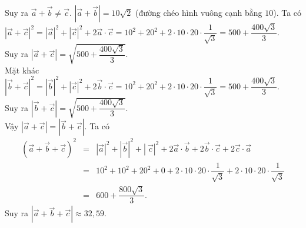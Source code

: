 \begin{ex}
{\begin{itemchoice}
			Suy ra $\overrightarrow{a}+\overrightarrow{b} \ne  \overrightarrow{c}$.
			\itemch $|\overrightarrow{a}+\overrightarrow{b}|=10\sqrt{2}$ (đường chéo hình vuông  cạnh bằng $10$).
			\itemch Ta có $\left|\overrightarrow{a}+\overrightarrow{c}\right|^2 = \left|\overrightarrow{a}\right|^2 + \left|\overrightarrow{c}\right|^2 + 2\overrightarrow{a}\cdot \overrightarrow{c} = 10^2 + 20^2 + 2\cdot 10\cdot 20\cdot \dfrac{1}{\sqrt{3}} = 500  + \dfrac{400\sqrt{3}}{3}$.\\
			Suy ra $\left|\overrightarrow{a}+\overrightarrow{c}\right| = \sqrt{500 + \dfrac{400\sqrt{3}}{3}}$.\\ 
			Mặt khác $\left|\overrightarrow{b}+\overrightarrow{c}\right|^2  = \left|\overrightarrow{b}\right|^2 + \left|\overrightarrow{c}\right|^2 + 2\overrightarrow{b}\cdot \overrightarrow{c} = 10^2 + 20^2 + 2\cdot 10\cdot 20\cdot \dfrac{1}{\sqrt{3}} = 500 + \dfrac{400\sqrt{3}}{3}$.\\
			 Suy ra $\left|\overrightarrow{b}+\overrightarrow{c}\right| = \sqrt{500 + \dfrac{400\sqrt{3}}{3}}$.\\
			Vậy $\left|\overrightarrow{a}+\overrightarrow{c}\right| =  \left|\overrightarrow{b}+\overrightarrow{c}\right|$.
			 \itemch
			 Ta có
			\begin{eqnarray*}
				 \left(\overrightarrow{a}+\overrightarrow{b}+\overrightarrow{c}\right)^2
				&=&\left|\overrightarrow{a}\right|^2 + \left|\overrightarrow{b}\right|^2  + \left|\
				\overrightarrow{c}\right|^2  + 2\overrightarrow{a}\cdot\overrightarrow{b} + 2\overrightarrow{b}\cdot \overrightarrow{c} + 2\overrightarrow{c}\cdot\overrightarrow{a}\\
				 &=&10^2 + 10^2 + 20^2 + 0 + 2\cdot 10\cdot 20\cdot \dfrac{1}{\sqrt{3}} + 2\cdot 10\cdot 20\cdot \dfrac{1}{\sqrt{3}}\\
				&=&600+ \dfrac{800\sqrt{3}}{3}. 
			\end{eqnarray*}
			Suy ra  $\left|\overrightarrow{a}+\overrightarrow{b}+\overrightarrow{c}\right| \approx 32{,}59$.
		\end{itemchoice}
	 }
\end{ex}

